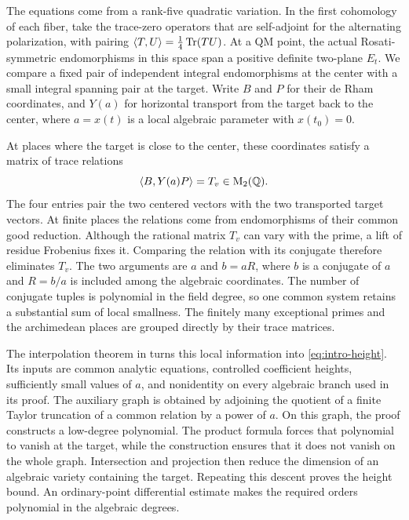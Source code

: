 The equations come from a rank-five quadratic variation.  In the first
cohomology of each fiber, take the trace-zero operators that are
self-adjoint for the alternating polarization, with pairing
\(\left\langle T,U\right\rangle=\tfrac14\operatorname{Tr}(TU)\).  At a QM point, the actual
Rosati-symmetric endomorphisms in this space span a positive definite
two-plane \(E_t\).  We compare a fixed pair of independent integral endomorphisms at the
center with a small integral spanning pair at the target.  Write \(B\) and
\(P\) for their de Rham coordinates, and \(Y(a)\) for horizontal
transport from the target back to the center, where \(a=x(t)\) is a
local algebraic parameter with \(x(t_0)=0\).

At places where the target is close to the center, these coordinates
satisfy a matrix of trace relations
\[
 \left\langle B,Y(a)P\right\rangle=T_v\in\mathrm M_2(\mathbb Q).
\]
The four entries pair the two centered vectors with the two transported
target vectors.  At finite places the relations come from endomorphisms
of their common good reduction.  Although the rational matrix \(T_v\)
can vary with the prime, a lift of residue Frobenius fixes it.  Comparing
the relation with its conjugate therefore eliminates \(T_v\).  The two
arguments are \(a\) and \(b=aR\), where \(b\) is a conjugate of \(a\)
and \(R=b/a\) is included among the algebraic coordinates.  The number of
conjugate tuples is polynomial in the field degree, so one common system retains
a substantial sum of local smallness.  The finitely many exceptional
primes and the archimedean places are grouped directly by their trace
matrices.

The interpolation theorem in  turns this local
information into \eqref{eq:intro-height}.  Its inputs are common analytic
equations, controlled coefficient heights, sufficiently small values of
\(a\), and nonidentity on every algebraic branch used in its proof.
The auxiliary graph is obtained by adjoining the quotient of a finite
Taylor truncation of a common relation by a power of \(a\).  On this
graph, the proof constructs a low-degree polynomial.  The product
formula forces that polynomial to vanish at the target, while the
construction ensures that it does not vanish on the whole graph.
Intersection and projection then reduce the dimension of an algebraic
variety containing the target.  Repeating this descent proves the height
bound.  An ordinary-point differential estimate makes the required orders
polynomial in the algebraic degrees.

